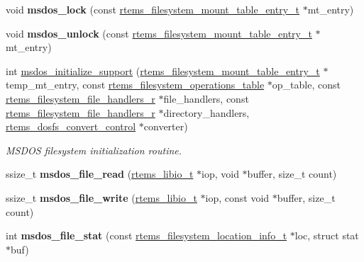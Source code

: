 \begin{DoxyCompactItemize}
void {\bfseries msdos\+\_\+lock} (const \mbox{\hyperlink{structrtems__filesystem__mount__table__entry__tt}{rtems\+\_\+filesystem\+\_\+mount\+\_\+table\+\_\+entry\+\_\+t}} $\ast$mt\+\_\+entry)
\item 
\mbox{\label{group__libfs__msdos_gaec07f325788ce0ea44d092687d7f3611}} 
void {\bfseries msdos\+\_\+unlock} (const \mbox{\hyperlink{structrtems__filesystem__mount__table__entry__tt}{rtems\+\_\+filesystem\+\_\+mount\+\_\+table\+\_\+entry\+\_\+t}} $\ast$mt\+\_\+entry)
\item 
int \mbox{\hyperlink{group__libfs__msdos_gab03ef344fdc3a391eea940b6fdd9da24}{msdos\+\_\+initialize\+\_\+support}} (\mbox{\hyperlink{structrtems__filesystem__mount__table__entry__tt}{rtems\+\_\+filesystem\+\_\+mount\+\_\+table\+\_\+entry\+\_\+t}} $\ast$temp\+\_\+mt\+\_\+entry, const \mbox{\hyperlink{struct__rtems__filesystem__operations__table}{rtems\+\_\+filesystem\+\_\+operations\+\_\+table}} $\ast$op\+\_\+table, const \mbox{\hyperlink{struct__rtems__filesystem__file__handlers__r}{rtems\+\_\+filesystem\+\_\+file\+\_\+handlers\+\_\+r}} $\ast$file\+\_\+handlers, const \mbox{\hyperlink{struct__rtems__filesystem__file__handlers__r}{rtems\+\_\+filesystem\+\_\+file\+\_\+handlers\+\_\+r}} $\ast$directory\+\_\+handlers, \mbox{\hyperlink{structrtems__dosfs__convert__control}{rtems\+\_\+dosfs\+\_\+convert\+\_\+control}} $\ast$converter)
\begin{DoxyCompactList}\small\item\em M\+S\+D\+OS filesystem initialization routine. \end{DoxyCompactList}\item 
\mbox{\label{group__libfs__msdos_gac8a171fd6c8fae2c2d607c403eec039e}} 
ssize\+\_\+t {\bfseries msdos\+\_\+file\+\_\+read} (\mbox{\hyperlink{structrtems__libio__tt}{rtems\+\_\+libio\+\_\+t}} $\ast$iop, void $\ast$buffer, size\+\_\+t count)
\item 
\mbox{\label{group__libfs__msdos_gacdd9376aba8d7069148dec54628d950d}} 
ssize\+\_\+t {\bfseries msdos\+\_\+file\+\_\+write} (\mbox{\hyperlink{structrtems__libio__tt}{rtems\+\_\+libio\+\_\+t}} $\ast$iop, const void $\ast$buffer, size\+\_\+t count)
\item 
\mbox{\label{group__libfs__msdos_gae69d38fe0dc76ea209057bb1d0722026}} 
int {\bfseries msdos\+\_\+file\+\_\+stat} (const \mbox{\hyperlink{group__LibIO_ga3252b3d31ee3c49ffff0b7604a676864}{rtems\+\_\+filesystem\+\_\+location\+\_\+info\+\_\+t}} $\ast$loc, struct stat $\ast$buf)

\end{DoxyCompactItemize}
